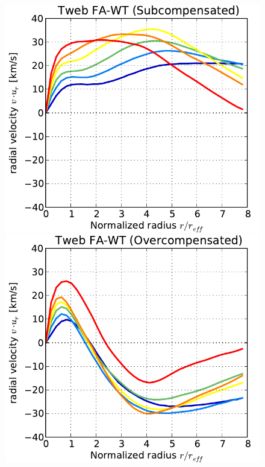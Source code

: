 \documentclass[a4,useAMS,usenatbib,usegraphicx]{mn2e}
\begin{document}
\begin{figure}
\centering  
  \includegraphics[trim = 1mm 0mm 5mm 0mm, clip, keepaspectratio=true,
  width=0.32\textheight]{voids_velocity_TwebFAG0.pdf}
  \includegraphics[trim = 1mm 0mm 5mm 0mm, clip, keepaspectratio=true,
  width=0.32\textheight]{voids_velocity_TwebFAG1.pdf}

\end{figure}
\end{document}
